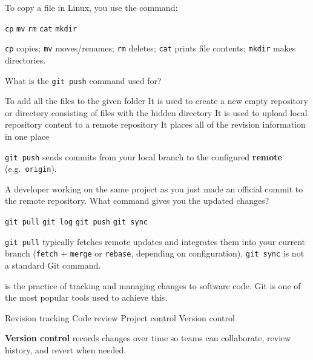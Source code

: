 \question[4]
To copy a file in Linux, you use the command:
\begin{choices}
  \CorrectChoice \texttt{cp}
  \choice \texttt{mv}
  \choice \texttt{rm}
  \choice \texttt{cat}
  \choice \texttt{mkdir}
\end{choices}
\begin{solution}
  \texttt{cp} copies; \texttt{mv} moves/renames; \texttt{rm} deletes; \texttt{cat} prints file contents; \texttt{mkdir} makes directories.
\end{solution}

\newpage



\question[4]
What is the \texttt{git push} command used for?
\begin{choices}
  \choice To add all the files to the given folder
  \choice It is used to create a new empty repository or directory consisting of files with the hidden directory
  \CorrectChoice It is used to upload local repository content to a remote repository
  \choice It places all of the revision information in one place
\end{choices}
\begin{solution}
  \texttt{git push} sends commits from your local branch to the configured \textbf{remote} (e.g.\ \texttt{origin}).
\end{solution}

\question[4]
A developer working on the same project as you just made an official commit to the remote repository. What command gives you the updated changes?
\begin{choices}
  \CorrectChoice \texttt{git pull}
  \choice \texttt{git log}
  \choice \texttt{git push}
  \choice \texttt{git sync}
\end{choices}
\begin{solution}
  \texttt{git pull} typically fetches remote updates and integrates them into your current branch (\texttt{fetch} + \texttt{merge} or \texttt{rebase}, depending on configuration). \texttt{git sync} is not a standard Git command.
\end{solution}

\question[4]
\blank[7em] is the practice of tracking and managing changes to software code. Git is one of the most popular tools used to achieve this.
\begin{choices}
  \choice Revision tracking
  \choice Code review
  \choice Project control
  \CorrectChoice Version control
\end{choices}
\begin{solution}
  \textbf{Version control} records changes over time so teams can collaborate, review history, and revert when needed.
\end{solution}

